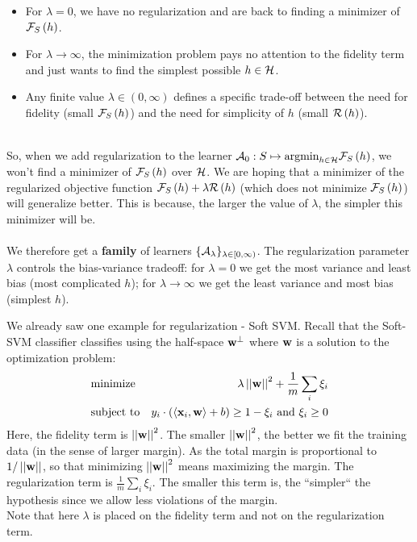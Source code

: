 \begin{itemize}
	\item For $\lambda=0$, we have no regularization and are back to finding a minimizer of $\mathcal{F}_S\left(h\right)$.
	\item For $\lambda \to\infty$, the minimization problem pays no attention to the fidelity term and just wants to find the simplest possible $h\in\mathcal{H}$.
	\item Any finite value $\lambda\in(0,\infty)$ defines a specific trade-off between the need for fidelity (small $\mathcal{F}_S\left(h\right)$) and the need for simplicity
	of $h$ (small $\mathcal{R}\left(h\right)$).
\end{itemize}
~\\
So, when we add regularization to the learner $\mathcal{A}_0:S\mapsto\text{argmin}_{h\in\mathcal{H}} \mathcal{F}_S\left(h\right)$, we won't find a minimizer of $\mathcal{F}_S\left(h\right)$ over $\mathcal{H}$. We are hoping that a minimizer of the regularized objective function $\mathcal{F}_S\left(h\right)+ \lambda \mathcal{R}\left(h\right) $ (which does not minimize $\mathcal{F}_S\left(h\right)$) will generalize better. This is because, the larger the value of $\lambda$, the simpler this minimizer will be.
\\~\\
We therefore get a \textbf{family} of learners $\{\mathcal{A}_\lambda\}_{\lambda\in[0,\infty)}$. The regularization parameter $\lambda$ controls the bias-variance tradeoff: for
$\lambda=0$ we get the most variance and least bias (most complicated $h$); for $\lambda\to\infty$ we get the least variance and most bias (simplest $h$).

\begin{remark}
We already saw one example for regularization - Soft SVM. Recall that the Soft-SVM classifier classifies using the half-space $\mathbf{w}^\perp$ where $\mathbf{w}$ is a solution to the optimization problem:
\begin{eqnarray*}
	& \text{minimize}   &  \lambda \left|\left| \mathbf{w}\right|\right|^2 + \frac{1}{m}\sum_i \xi_i \\
	& \text{subject to} & y_i \cdot \left( \left\langle \mathbf{x}_i,\mathbf{w}\right\rangle +b \right) \geq 1-\xi_i  \,\,\text{and}\,\, \xi_i\geq 0 
\end{eqnarray*}
Here, the fidelity term is $\left|\left| \mathbf{w}\right|\right|^2$. The smaller $\left|\left| \mathbf{w}\right|\right|^2$, the better we fit the training data (in the sense of larger margin). As the total margin is proportional to $1/\left|\left| \mathbf{w}\right|\right|$, so that minimizing  $\left|\left| \mathbf{w}\right|\right|^2$ means maximizing the margin. The regularization term is  $\frac{1}{m}\sum_i \xi_i$. The smaller this term is, the ``simpler`` the hypothesis since we allow less violations of the margin.
~\\
Note that here $\lambda$ is placed on the fidelity term and not on the regularization term.
\end{remark}

